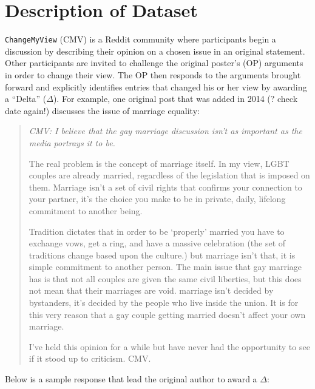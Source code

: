 \section{Description of Dataset}\label{description-of-dataset}

\texttt{ChangeMyView} (CMV) is a Reddit community where participants begin a discussion by describing their opinion on a chosen issue in an original statement. Other participants are invited to challenge the original poster's (OP) arguments in order to change their view. The OP then responds to the arguments brought forward and explicitly identifies entries that changed his or her view by awarding a ``Delta'' (\(\Delta\)). For example, one original post that was added in 2014 (? check date again!) discusses the issue of marriage equality: 
\begin{quote}\singlespacing
\emph{CMV: I believe that the gay marriage discussion isn't as important as the media portrays it to be.}

The real problem is the concept of marriage itself. In my view, LGBT couples are already married, regardless of the legislation that is imposed on them. Marriage isn't a set of civil rights that confirms your connection to your partner, it's the choice you make to be in private, daily, lifelong commitment to another being.

Tradition dictates that in order to be `properly' married you have to exchange vows, get a ring, and have a massive celebration (the set of traditions change based upon the culture.) but marriage isn't that, it is simple commitment to another person. The main issue that gay marriage has is that not all couples are given the same civil liberties, but this does not mean that their marriages are void. marriage isn't decided by bystanders, it's decided by the people who live inside the union. It is for this very reason that a gay couple getting married doesn't affect your own marriage.

I've held this opinion for a while but have never had the opportunity to see if it stood up to criticism. CMV.
\end{quote}
Below is a sample response that lead the original author to award a \(\Delta\):
